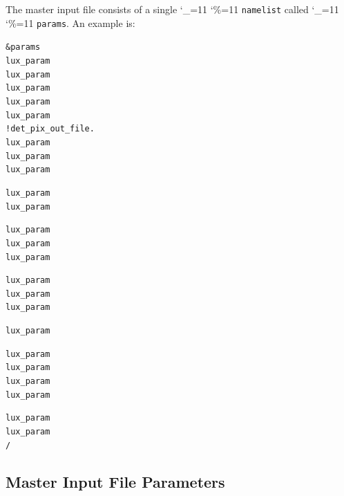 \documentclass[11pt]{article}
\newcommand\ttcmd{\begingroup\catcode`\_=11 \catcode`\%=11 \dottcmd}
\newcommand\dottcmd[1]{\texttt{#1}\endgroup}
\newcommand{\vn}{\ttcmd}
\newenvironment{example}
  {\vspace{\ExBeg} \begin{alltt}}
  {\end{alltt} \vspace{\ExEnd}}
\newlength{\ExBeg}
\newlength{\ExEnd}
\begin{document}
The master input file consists of a single \vn{namelist} called \vn{params}.
An example is:
\begin{example}
  &params
    lux_param%
    lux_param%
    lux_param%
    lux_param%
    lux_param%
                                                 !             det_pix_out_file.
    lux_param%
    lux_param%
    lux_param%

    lux_param%
    lux_param%

    lux_param%
    lux_param%
    lux_param%

    lux_param%
    lux_param%
    lux_param%

    lux_param%

    lux_param%
    lux_param%
    lux_param%
    lux_param%

    lux_param%
    lux_param%
  /
\end{example}

\subsection{Master Input File Parameters}
\label{ss:master.params}
\end{document}
